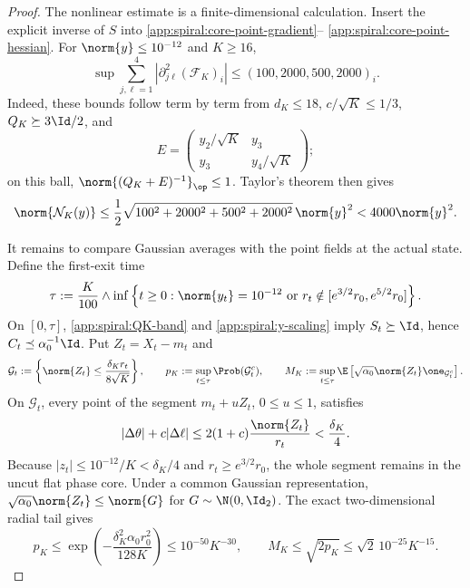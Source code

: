 \begin{proof}
The nonlinear estimate is a finite-dimensional calculation.  Insert the
explicit inverse of \(S\) into
\eqref{app:spiral:core-point-gradient}--%
\eqref{app:spiral:core-point-hessian}.  For
\(\norm{y}\leq10^{-12}\) and \(K\geq16\),
\begin{equation}
\label{app:spiral:second-derivative-table}
 \sup\sum_{j,\ell=1}^4
 \left|\partial_{j\ell}^2(\mathcal F_K)_i\right|
 \leq(100,2000,500,2000)_i.
\end{equation}
Indeed, these bounds follow term by term from
\(d_K\leq18\), \(c/\sqrt K\leq1/3\),
\(Q_K\succeq3\Id/2\), and
\[
 E=\begin{pmatrix}
 y_2/\sqrt K&y_3\\y_3&y_4/\sqrt K
 \end{pmatrix};
\]
on this ball,
\(\norm{(Q_K+E)^{-1}}_{\op}\leq1\).  Taylor's theorem then gives
\begin{equation}
\label{app:spiral:nonlinear-bound}
 \norm{\mathcal N_K(y)}
 \leq\frac12\sqrt{100^2+2000^2+500^2+2000^2}\,\norm{y}^2
 <4000\norm{y}^2.
\end{equation}

It remains to compare Gaussian averages with the point fields at the actual
state.  Define the first-exit time
\begin{equation}
\label{app:spiral:stopping-time}
 \tau:=\frac K{100}\wedge
 \inf\left\{t\geq0:\norm{y_t}=10^{-12}
 \ \text{or}\ r_t\notin[e^{3/2}r_0,e^{5/2}r_0]\right\}.
\end{equation}
On \([0,\tau]\), \eqref{app:spiral:QK-band} and
\eqref{app:spiral:y-scaling} imply \(S_t\succeq\Id\), hence
\(C_t\preceq \alpha_0^{-1}\Id\).  Put \(Z_t=X_t-m_t\) and
\[
 \mathcal G_t
 :=\left\{\norm{Z_t}\leq\frac{\delta_Kr_t}{8\sqrt K}\right\},
 \qquad
 p_K:=\sup_{t\leq\tau}\Prob(\mathcal G_t^c),
 \qquad
 M_K:=\sup_{t\leq\tau}
 \E\left[\sqrt{\alpha_0}\norm{Z_t}\one_{\mathcal G_t^c}\right].
\]
On \(\mathcal G_t\), every point of the segment
\(m_t+uZ_t\), \(0\leq u\leq1\), satisfies
\[
 |\Delta\theta|+c|\Delta\ell|
 \leq2(1+c)\frac{\norm{Z_t}}{r_t}
 <\frac{\delta_K}{4}.
\]
Because
\(|z_t|\leq10^{-12}/K<\delta_K/4\) and
\(r_t\geq e^{3/2}r_0\), the whole segment remains in the uncut flat
phase core.  Under a common Gaussian representation,
\(\sqrt{\alpha_0}\norm{Z_t}\leq\norm{G}\) for
\(G\sim\N(0,\Id_2)\).  The exact two-dimensional radial tail gives
\begin{equation}
\label{app:spiral:tail-certificate}
 p_K
 \leq\exp\left(-\frac{\delta_K^2\alpha_0r_0^2}{128K}\right)
 \leq10^{-50}K^{-30},
 \qquad
 M_K\leq\sqrt{2p_K}\leq\sqrt2\,10^{-25}K^{-15}.
\end{equation}


\end{proof}
